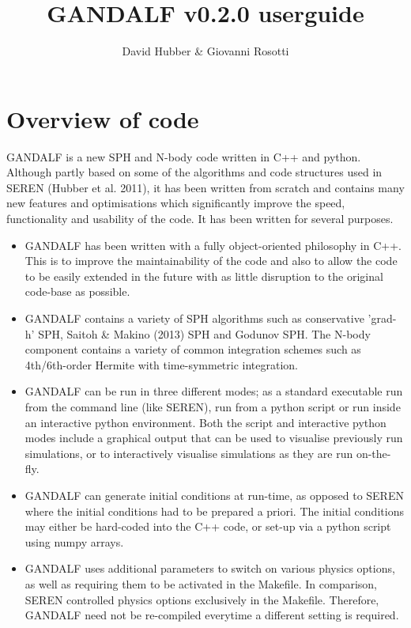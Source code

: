 \documentclass[a4paper]{article}
\newcommand{\VERNO}{0.2.0 }
\begin{document}
\title{GANDALF v\VERNO userguide}
\author{David Hubber \& Giovanni Rosotti}

\maketitle
\tableofcontents

\newpage


\section{Overview of code}
GANDALF is a new SPH and N-body code written in C++ and python.  Although partly based on some of the algorithms and code structures used in SEREN (Hubber et al. 2011), it has been written from scratch and contains many new features and optimisations which significantly improve the speed, functionality and usability of the code.  It has been written for several purposes.
\begin{itemize}
\item GANDALF has been written with a fully object-oriented philosophy in C++.  This is to improve the maintainability of the code and also to allow the code to be easily extended in the future with as little disruption to the original code-base as possible.
\item GANDALF contains a variety of SPH algorithms such as conservative 'grad-h' SPH, Saitoh \& Makino (2013) SPH and Godunov SPH.  The N-body component contains a variety of common integration schemes such as 4th/6th-order Hermite with time-symmetric integration.
\item GANDALF can be run in three different modes; as a standard executable run from the command line (like SEREN), run from a python script or run inside an interactive python environment.  Both the script and interactive python modes include a graphical output that can be used to visualise previously run simulations, or to interactively visualise simulations as they are run on-the-fly.
\item GANDALF can generate initial conditions at run-time, as opposed to SEREN where the initial conditions had to be prepared a priori.  The initial conditions may either be hard-coded into the C++ code, or set-up via a python script using numpy arrays.
\item GANDALF uses additional parameters to switch on various physics options, as well as requiring them to be activated in the Makefile.  In comparison, SEREN controlled physics options exclusively in the Makefile.  Therefore, GANDALF need not be re-compiled everytime a different setting is required.
\end{itemize}
\end{document}
